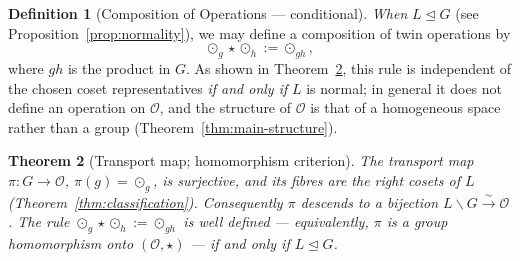 \documentclass[11pt,a4paper,openany]{book}
\theoremstyle{plain}
\newtheorem{theorem}{Theorem}[chapter]
\theoremstyle{definition}
\newtheorem{definition}[theorem]{Definition}
\newcommand{\twing}[1]{\odot_{#1}}
\newcommand{\opspace}{\mathcal{O}}
\newcommand{\lingroup}{L}
\newcommand{\groupG}{G}
\begin{document}
\begin{definition}[Composition of Operations --- conditional]\label{def:op-composition}
\emph{When} $\lingroup \trianglelefteq \groupG$ (see Proposition~\ref{prop:normality}), we may define a composition of twin operations by
\[
\twing{g} \star \twing{h} := \twing{gh},
\]
where $gh$ is the product in $\groupG$. As shown in Theorem~\ref{thm:homomorphism}, this rule is independent of the chosen coset representatives \emph{if and only if} $\lingroup$ is normal; in general it does not define an operation on $\opspace$, and the structure of $\opspace$ is that of a homogeneous space rather than a group (Theorem~\ref{thm:main-structure}).
\end{definition}

\begin{theorem}[Transport map; homomorphism criterion]\label{thm:homomorphism}
The transport map $\pi: \groupG \to \opspace$, $\pi(g) = \twing{g}$, is surjective, and its fibres are the right cosets of $\lingroup$ (Theorem~\ref{thm:classification}). Consequently $\pi$ descends to a \emph{bijection} $\lingroup\backslash\groupG \xrightarrow{\sim} \opspace$. The rule $\twing{g}\star\twing{h}:=\twing{gh}$ is well defined --- equivalently, $\pi$ is a group homomorphism onto $(\opspace,\star)$ --- \emph{if and only if} $\lingroup \trianglelefteq \groupG$.
\end{theorem}
\end{document}
